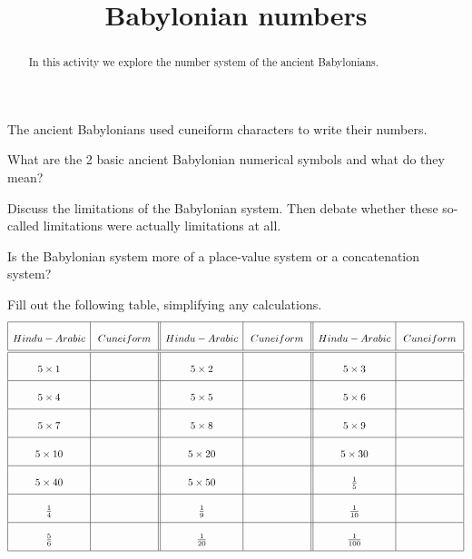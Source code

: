 \documentclass[nooutcomes]{ximera}
\title{Babylonian numbers}
\begin{document}
\begin{abstract}In this activity we explore the number system of the ancient
  Babylonians.
\end{abstract} 
\maketitle


The ancient Babylonians used cuneiform characters to write their
numbers.

\begin{exercise}
What are the 2 basic ancient Babylonian numerical symbols and what do
they mean?
\end{exercise}






\begin{exploration}
Discuss the limitations of the Babylonian system. Then debate whether
these so-called limitations were actually limitations at all.
\end{exploration}

\begin{exploration}
Is the Babylonian system more of a place-value system or a
concatenation system?
\end{exploration}


\begin{problem} 
Fill out the following table, simplifying any calculations.
\[\renewcommand{\arraystretch}{2.3}
\begin{array}{| c | c || c | c || c | c |} 
\hline %
Hindu-Arabic  & Cuneiform & Hindu-Arabic & Cuneiform & Hindu-Arabic & Cuneiform \\ \hline\hline 
5 \times 1 & \hspace{20mm}  & 5 \times 2  &\hspace{20mm}  & 5 \times 3 & \hspace{20mm}\\ \hline
5 \times 4 &  & 5 \times 5 &  & 5 \times 6 &   \\ \hline
5 \times 7 &   & 5 \times 8 &  & 5 \times 9 &   \\ \hline
5 \times 10 &   & 5 \times 20 &  & 5 \times 30 &   \\ \hline
5 \times 40 &   & 5 \times 50 &  & \frac15 &   \\ \hline
\frac{1}{4} &   & \frac{1}{9} &  & \frac{1}{10}&   \\ \hline
\frac{5}{6} &   & \frac{1}{20} &  & \frac{1}{100} &   \\ \hline
\end{array}
\]
\end{problem}
\end{document}
